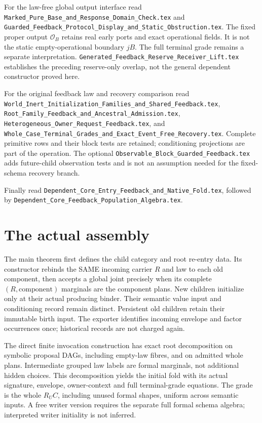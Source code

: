 \documentclass[11pt]{article}
\begin{document}
For the law-free global output interface read \texttt{Marked\_Pure\_Base\_and\_Response\_Domain\_Check.tex} and \texttt{Guarded\_Feedback\_Protocol\_Display\_and\_Static\_Obstruction.tex}. The fixed proper output $\mathcal O_B$ retains real early ports and exact operational fields. It is not the static empty-operational boundary $jB$. The full terminal grade remains a separate interpretation. \texttt{Generated\_Feedback\_Reserve\_Receiver\_Lift.tex} establishes the preceding reserve-only overlap, not the general dependent constructor proved here.

For the original feedback law and recovery comparison read \texttt{World\_Inert\_Initialization\_Families\_and\_Shared\_Feedback.tex}, \texttt{Root\_Family\_Feedback\_and\_Ancestral\_Admission.tex}, \texttt{Heterogeneous\_Owner\_Request\_Feedback.tex}, and \texttt{Whole\_Case\_Terminal\_Grades\_and\_Exact\_Event\_Free\_Recovery.tex}. Complete primitive rows and their block tests are retained; conditioning projections are part of the operation. The optional \texttt{Observable\_Block\_Guarded\_Feedback.tex} adds future-child observation tests and is not an assumption needed for the fixed-schema recovery branch.

Finally read \texttt{Dependent\_Core\_Entry\_Feedback\_and\_Native\_Fold.tex}, followed by \texttt{Dependent\_Core\_Feedback\_Population\_Algebra.tex}.

\section{The actual assembly}
The main theorem first defines the child category and root re-entry data. Its constructor rebinds the SAME incoming carrier $R$ and law to each old component, then accepts a global joint precisely when its complete $(R,\text{component})$ marginals are the component plans. New children initialize only at their actual producing binder. Their semantic value input and conditioning record remain distinct. Persistent old children retain their immutable birth input. The exporter identifies incoming envelope and factor occurrences once; historical records are not charged again.

The direct finite invocation construction has exact root decomposition on symbolic proposal DAGs, including empty-law fibres, and on admitted whole plans. Intermediate grouped law labels are formal marginals, not additional hidden choices. This decomposition yields the initial fold with its actual signature, envelope, owner-context and full terminal-grade equations. The grade is the whole $R_UC$, including unused formal shapes, uniform across semantic inputs. A free writer version requires the separate full formal schema algebra; interpreted writer initiality is not inferred.
\end{document}
